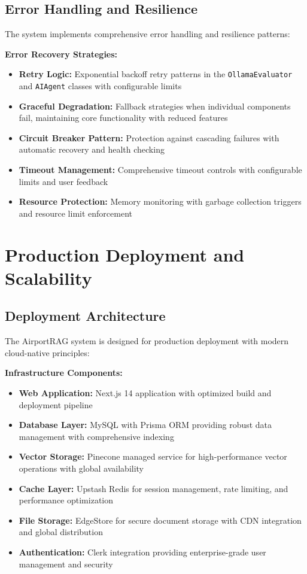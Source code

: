 \subsection{Error Handling and Resilience}
\label{subsec:error_handling_s3}

The system implements comprehensive error handling and resilience patterns:

\textbf{Error Recovery Strategies:}
\begin{itemize}
    \item \textbf{Retry Logic:} Exponential backoff retry patterns in the \texttt{OllamaEvaluator} and \texttt{AIAgent} classes with configurable limits
    \item \textbf{Graceful Degradation:} Fallback strategies when individual components fail, maintaining core functionality with reduced features
    \item \textbf{Circuit Breaker Pattern:} Protection against cascading failures with automatic recovery and health checking
    \item \textbf{Timeout Management:} Comprehensive timeout controls with configurable limits and user feedback
    \item \textbf{Resource Protection:} Memory monitoring with garbage collection triggers and resource limit enforcement
\end{itemize}

\section{Production Deployment and Scalability}
\label{sec:production_deployment_s3}

\subsection{Deployment Architecture}
\label{subsec:deployment_architecture_s3}

The AirportRAG system is designed for production deployment with modern cloud-native principles:

\textbf{Infrastructure Components:}
\begin{itemize}
    \item \textbf{Web Application:} Next.js 14 application with optimized build and deployment pipeline
    \item \textbf{Database Layer:} MySQL with Prisma ORM providing robust data management with comprehensive indexing
    \item \textbf{Vector Storage:} Pinecone managed service for high-performance vector operations with global availability
    \item \textbf{Cache Layer:} Upstash Redis for session management, rate limiting, and performance optimization
    \item \textbf{File Storage:} EdgeStore for secure document storage with CDN integration and global distribution
    \item \textbf{Authentication:} Clerk integration providing enterprise-grade user management and security
\end{itemize}

